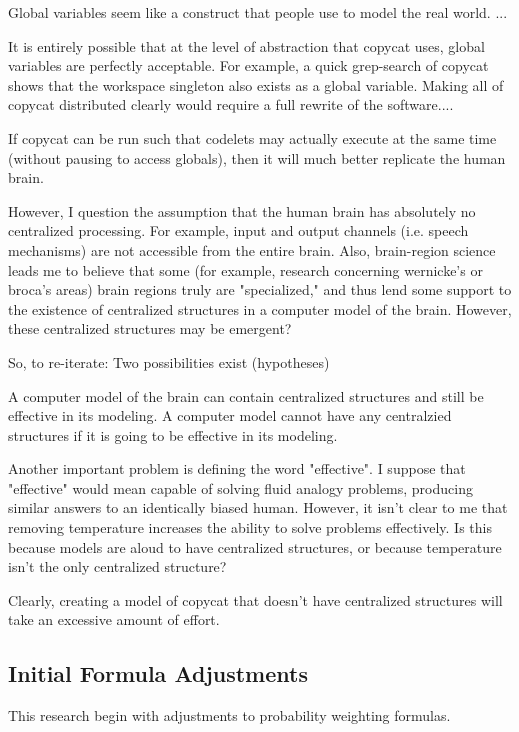 \documentclass[a4paper]{article}
\begin{document}
    Global variables seem like a construct that people use to model the real world.
    ...

    It is entirely possible that at the level of abstraction that copycat uses, global variables are perfectly acceptable.
    For example, a quick grep-search of copycat shows that the workspace singleton also exists as a global variable.
    Making all of copycat distributed clearly would require a full rewrite of the software....

    If copycat can be run such that codelets may actually execute at the same time (without pausing to access globals), then it will much better replicate the human brain.

    However, I question the assumption that the human brain has absolutely no centralized processing.
    For example, input and output channels (i.e. speech mechanisms) are not accessible from the entire brain.
    Also, brain-region science leads me to believe that some (for example, research concerning wernicke's or broca's areas) brain regions truly are "specialized," and thus lend some support to the existence of centralized structures in a computer model of the brain.
    However, these centralized structures may be emergent?

    So, to re-iterate: Two possibilities exist (hypotheses)

    A computer model of the brain can contain centralized structures and still be effective in its modeling.
    A computer model cannot have any centralzied structures if it is going to be effective in its modeling.

    Another important problem is defining the word "effective".
    I suppose that "effective" would mean capable of solving fluid analogy problems, producing similar answers to an identically biased human.
    However, it isn't clear to me that removing temperature increases the ability to solve problems effectively.
    Is this because models are aloud to have centralized structures, or because temperature isn't the only centralized structure?

    Clearly, creating a model of copycat that doesn't have centralized structures will take an excessive amount of effort.

\subsection{Initial Formula Adjustments}

This research begin with adjustments to probability weighting formulas.
\end{document}
